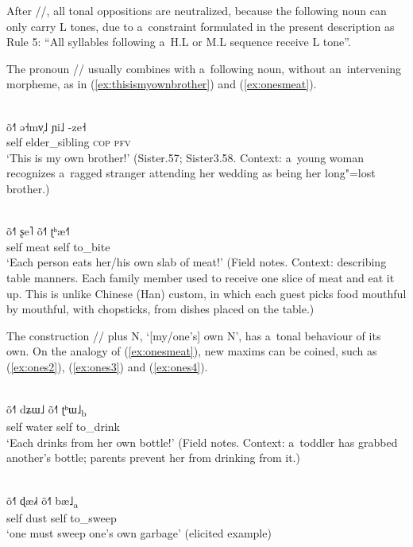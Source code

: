 After //, all tonal oppositions are neutralized, because the following noun can only
carry L tones, due to a~constraint formulated in the present description as Rule 5: “All syllables following a~H.L or M.L sequence receive L tone”.

The pronoun // usually combines with a~following noun, without an~intervening morpheme, as
in (\ref{ex:thisismyownbrother}) and (\ref{ex:onesmeat}).
\begin{exe}
  \ex
  \label{ex:thisismyownbrother}
  \\
  \gll õ˧˥	ə˧mv̩˩		ɲi˩	-ze˧\\
  self	elder\_sibling	\textsc{cop}	\textsc{pfv}\\
  \glt ‘This is my own brother!’ (Sister.57; Sister3.58. Context: a~young woman recognizes a~ragged
  stranger attending her wedding as being her long"=lost brother.)
\end{exe}

\begin{exe}
	\ex
	\label{ex:onesmeat}
	\\
	\gll õ˧˥	ʂe˥		õ˧˥	ʈʰæ˧˥\\
	self	meat	self	to\_bite\\
	\glt ‘Each person eats her/his own slab of meat!’ (Field notes. Context: describing
	table manners. Each family member used to receive
	one slice of meat and eat it up. This is unlike
	Chinese (Han) custom, in which each guest picks food
	mouthful by mouthful, with chopsticks, from dishes placed on the table.)
\end{exe}

The construction // plus N, ‘[my/one’s] own N’, has a~tonal behaviour of its
own. On the {analogy} of
(\ref{ex:onesmeat}), new maxims can be coined, such as (\ref{ex:ones2}), (\ref{ex:ones3}) and (\ref{ex:ones4}). 

\begin{exe}
	\ex
	\label{ex:ones2}
	\\
	\gll õ˧˥	dʑɯ˩	õ˧˥	ʈʰɯ˩\textsubscript{b}\\
	self	water	self	to\_drink\\
	\glt ‘Each drinks from her own bottle!’ (Field notes. Context: a~toddler has grabbed another’s bottle; parents
	prevent her from drinking from it.)
\end{exe}

\begin{exe}
	\ex
	\label{ex:ones3}
	\\
	\gll õ˧˥	ɖæ˩˧	õ˧˥	bæ˩\textsubscript{a}\\
	self	dust	self	to\_sweep\\
	\glt ‘one must sweep one’s
	own garbage’ (elicited example)
\end{exe}


